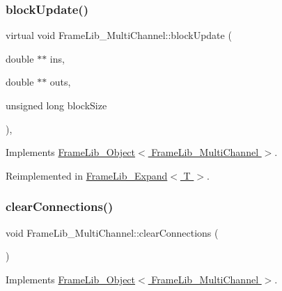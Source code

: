 \subsubsection{\texorpdfstring{block\+Update()}{blockUpdate()}}
{\footnotesize\ttfamily virtual void Frame\+Lib\+\_\+\+Multi\+Channel\+::block\+Update (\begin{DoxyParamCaption}\item[{double $\ast$$\ast$}]{ins,  }\item[{double $\ast$$\ast$}]{outs,  }\item[{unsigned long}]{block\+Size }\end{DoxyParamCaption})\hspace{0.3cm}{\ttfamily [inline]}, {\ttfamily [virtual]}}



Implements \hyperlink{class_frame_lib___object_a6efd81ab386e62400960471fa3cc94e7}{Frame\+Lib\+\_\+\+Object$<$ Frame\+Lib\+\_\+\+Multi\+Channel $>$}.



Reimplemented in \hyperlink{class_frame_lib___expand_ae712d631cb99284e91c3f318534b3c03}{Frame\+Lib\+\_\+\+Expand$<$ T $>$}.

\mbox{\label{class_frame_lib___multi_channel_aa7dfda2331a430b0db3f43d3bde293aa}} 
\subsubsection{\texorpdfstring{clear\+Connections()}{clearConnections()}}
{\footnotesize\ttfamily void Frame\+Lib\+\_\+\+Multi\+Channel\+::clear\+Connections (\begin{DoxyParamCaption}{ }\end{DoxyParamCaption})\hspace{0.3cm}{\ttfamily [virtual]}}



Implements \hyperlink{class_frame_lib___object_a5b219c0cb96a7b6b1f0c471f665337ec}{Frame\+Lib\+\_\+\+Object$<$ Frame\+Lib\+\_\+\+Multi\+Channel $>$}.

\mbox{\label{class_frame_lib___multi_channel_ad8b21345a7b864a48060d2475af2fe1e}} 
